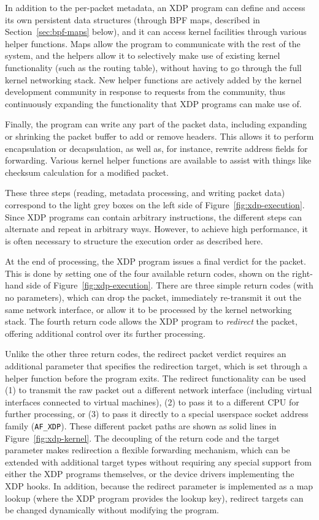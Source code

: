 \documentclass[sigconf]{acmart}
\begin{document}
In addition to the per-packet metadata, an XDP program can define and access its
own persistent data structures (through BPF maps, described in
Section~\ref{sec:bpf-maps} below), and it can access kernel facilities through
various helper functions. Maps allow the program to communicate with the rest of
the system, and the helpers allow it to selectively make use of existing kernel
functionality (such as the routing table), without having to go through the full
kernel networking stack. New helper functions are actively added by the kernel
development community in response to requests from the community, thus
continuously expanding the functionality that XDP programs can make use of.

Finally, the program can write any part of the packet data, including expanding
or shrinking the packet buffer to add or remove headers. This allows it to
perform encapsulation or decapsulation, as well as, for instance, rewrite
address fields for forwarding. Various kernel helper functions are available to
assist with things like checksum calculation for a modified packet.

These three steps (reading, metadata processing, and writing packet data)
correspond to the light grey boxes on the left side of
Figure~\ref{fig:xdp-execution}. Since XDP programs can contain arbitrary
instructions, the different steps can alternate and repeat in arbitrary ways.
However, to achieve high performance, it is often necessary to structure the
execution order as described here.

At the end of processing, the XDP program issues a final verdict for the packet.
This is done by setting one of the four available return codes, shown on the
right-hand side of Figure~\ref{fig:xdp-execution}. There are three simple return
codes (with no parameters), which can drop the packet, immediately re-transmit
it out the same network interface, or allow it to be processed by the kernel
networking stack. The fourth return code allows the XDP program to
\emph{redirect} the packet, offering additional control over its further
processing.

Unlike the other three return codes, the redirect packet verdict requires an
additional parameter that specifies the redirection target, which is set through
a helper function before the program exits. The redirect functionality can be
used (1) to transmit the raw packet out a different network interface (including
virtual interfaces connected to virtual machines), (2) to pass it to a different
CPU for further processing, or (3) to pass it directly to a special userspace
socket address family (\texttt{AF\_XDP}). These different packet paths are shown
as solid lines in Figure~\ref{fig:xdp-kernel}. The decoupling of the return code
and the target parameter makes redirection a flexible forwarding mechanism,
which can be extended with additional target types without requiring any special
support from either the XDP programs themselves, or the device drivers
implementing the XDP hooks. In addition, because the redirect parameter is
implemented as a map lookup (where the XDP program provides the lookup key),
redirect targets can be changed dynamically without modifying the program.
\end{document}
